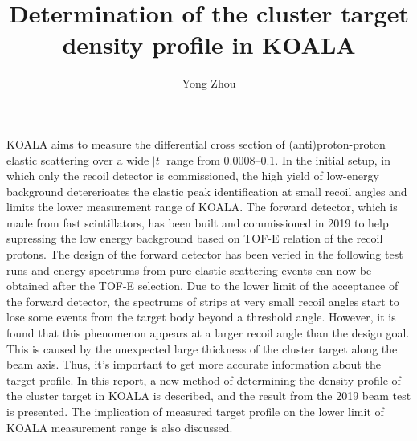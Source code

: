 \documentclass[fleqn,twocolumn,a4paper]{ikpar}
\begin{document}
\parindent=0pt
\frenchspacing

\title{{\bf
    Determination of the cluster target density profile in KOALA
}}
\author{Yong Zhou
}

\maketitle

KOALA aims to measure the differential cross section of (anti)proton-proton elastic
scattering over a wide $|t|$ range from \SIrange{0.0008}{0.1}{\tmom}.
In the initial setup, in which only the recoil detector is commissioned, the high yield of low-energy
background detererioates the elastic peak identification at small recoil angles and limits the lower measurement range of KOALA.
The forward detector, which is made from fast scintillators, has been built and
commissioned in 2019 to help supressing the low energy background based on TOF-E
relation of the recoil protons.
The design of the forward detector has been veried in the following test runs and energy spectrums from pure elastic scattering events can now be obtained after the TOF-E selection.
Due to the lower limit of the acceptance of the forward detector, the spectrums
of strips at very small recoil angles start to lose some events from the
target body beyond a threshold angle.
However, it is found that this phenomenon appears at a larger recoil angle than the design goal.
This is caused by the unexpected large thickness of the cluster target along the beam axis.
Thus, it's important to get more accurate information about the target profile.
In this report, a new method of determining the density profile of the cluster
target in KOALA is described, and the result from the 2019 beam test is presented.
The implication of measured target profile on the lower limit of KOALA measurement range is also discussed.

\par
\medskip
\end{document}
